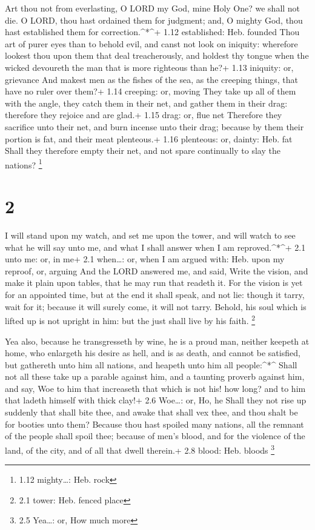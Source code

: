  Art thou not from everlasting, O LORD my God, mine Holy
One? we shall not die. O LORD, thou hast ordained them for judgment;
and, O mighty God, thou hast established them for correction.\^{}*\^{}+
1.12 established: Heb. founded  Thou art of purer eyes than
to behold evil, and canst not look on iniquity: wherefore lookest thou
upon them that deal treacherously, and holdest thy tongue when the
wicked devoureth the man that is more righteous than he?+ 1.13 iniquity:
or, grievance  And makest men as the fishes of the sea, as
the creeping things, that have no ruler over them?+ 1.14 creeping: or,
moving  They take up all of them with the angle, they catch
them in their net, and gather them in their drag: therefore they rejoice
and are glad.+ 1.15 drag: or, flue net  Therefore they
sacrifice unto their net, and burn incense unto their drag; because by
them their portion is fat, and their meat plenteous.+ 1.16 plenteous:
or, dainty: Heb. fat  Shall they therefore empty their net,
and not spare continually to slay the nations? \footnote{1.12
  mighty\ldots: Heb. rock}

\hypertarget{section-1}{%
\section{2}\label{section-1}}

 I will stand upon my watch, and set me upon the tower, and
will watch to see what he will say unto me, and what I shall answer when
I am reproved.\^{}*\^{}+ 2.1 unto me: or, in me+ 2.1 when\ldots: or,
when I am argued with: Heb. upon my reproof, or, arguing 
And the LORD answered me, and said, Write the vision, and make it plain
upon tables, that he may run that readeth it.  For the
vision is yet for an appointed time, but at the end it shall speak, and
not lie: though it tarry, wait for it; because it will surely come, it
will not tarry.  Behold, his soul which is lifted up is not
upright in him: but the just shall live by his faith. \footnote{2.1
  tower: Heb. fenced place}

 Yea also, because he transgresseth by wine, he is a proud
man, neither keepeth at home, who enlargeth his desire as hell, and is
as death, and cannot be satisfied, but gathereth unto him all nations,
and heapeth unto him all people:\^{}*\^{}  Shall not all
these take up a parable against him, and a taunting proverb against him,
and say, Woe to him that increaseth that which is not his! how long? and
to him that ladeth himself with thick clay!+ 2.6 Woe\ldots: or, Ho, he
 Shall they not rise up suddenly that shall bite thee, and
awake that shall vex thee, and thou shalt be for booties unto them?
 Because thou hast spoiled many nations, all the remnant of
the people shall spoil thee; because of men's blood, and for the
violence of the land, of the city, and of all that dwell therein.+ 2.8
blood: Heb. bloods \footnote{2.5 Yea\ldots: or, How much more}

